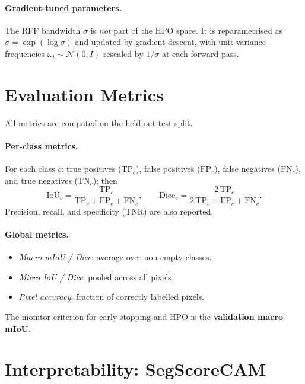 \documentclass[12pt,a4paper]{article}
\theoremstyle{definition}
\begin{document}
\paragraph{Gradient-tuned parameters.}
The RFF bandwidth $\sigma$ is \emph{not} part of the HPO space.  It is
reparametrised as $\sigma = \exp(\log\sigma)$ and updated by gradient
descent, with unit-variance frequencies $\omega_i \sim \mathcal{N}(0,I)$
rescaled by $1/\sigma$ at each forward pass.

\section{Evaluation Metrics}

All metrics are computed on the held-out test split.

\paragraph{Per-class metrics.}
For each class $c$: true positives ($\mathrm{TP}_c$), false positives
($\mathrm{FP}_c$), false negatives ($\mathrm{FN}_c$), and true negatives
($\mathrm{TN}_c$); then
\[
  \mathrm{IoU}_c = \frac{\mathrm{TP}_c}{\mathrm{TP}_c + \mathrm{FP}_c + \mathrm{FN}_c},
  \qquad
  \mathrm{Dice}_c = \frac{2\,\mathrm{TP}_c}{2\,\mathrm{TP}_c + \mathrm{FP}_c + \mathrm{FN}_c}.
\]
Precision, recall, and specificity (TNR) are also reported.

\paragraph{Global metrics.}
\begin{itemize}[noitemsep]
  \item \emph{Macro mIoU / Dice}: average over non-empty classes.
  \item \emph{Micro IoU / Dice}: pooled across all pixels.
  \item \emph{Pixel accuracy}: fraction of correctly labelled pixels.
\end{itemize}

The monitor criterion for early stopping and HPO is the \textbf{validation
macro mIoU}.

\section{Interpretability: SegScoreCAM}
\end{document}
